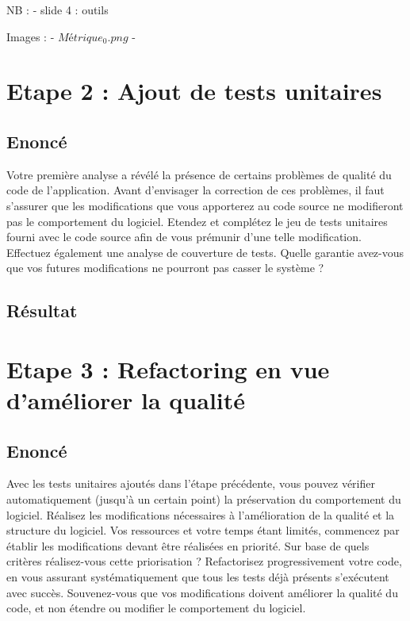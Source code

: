 \documentclass[12pt,a4paper,final]{article}
\begin{document}
NB : 
- slide 4 : outils

Images : 
- $Métrique_0.png$
- 

\section{Etape 2 : Ajout de tests unitaires}\label{sec:etape2}
\subsection{Enoncé}
Votre première analyse a révélé la présence de certains problèmes de qualité du code de l'application.
Avant d'envisager la correction de ces problèmes, il faut s'assurer que les modifications que vous apporterez au code source ne modifieront pas le comportement du logiciel.
Etendez et complétez le jeu de tests unitaires fourni avec le code source afin de vous prémunir d'une telle modification. Effectuez également une analyse de couverture de tests.
Quelle garantie avez-vous que vos futures modifications ne pourront pas casser le système ?

\subsection{Résultat}



\section{Etape 3 : Refactoring en vue d'améliorer la qualité}\label{sec:etape3}
\subsection{Enoncé}
Avec les tests unitaires ajoutés dans l'étape précédente, vous pouvez vérifier automatiquement (jusqu'à un certain point) la préservation du comportement du logiciel. Réalisez les modifications nécessaires à l'amélioration de la qualité et la structure du logiciel. 
Vos ressources et votre temps étant limités, commencez par établir les modifications devant être réalisées en priorité. Sur base de quels critères réalisez-vous cette priorisation ?
Refactorisez progressivement votre code, en vous assurant systématiquement que tous les tests déjà présents s'exécutent avec succès. Souvenez-vous que vos modifications doivent améliorer la qualité du code, et non étendre ou modifier le comportement du logiciel.
\end{document}
